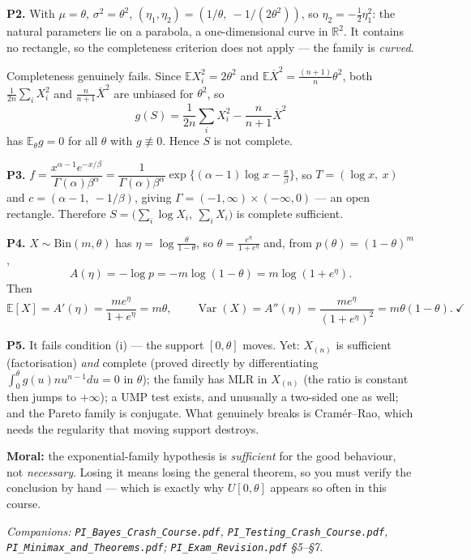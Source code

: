 \documentclass[11pt]{article}
\newcommand{\E}{\mathbb{E}}
\newcommand{\Var}{\operatorname{Var}}
\newcommand{\R}{\mathbb{R}}
\newcommand{\Xbar}{\overline{X}}
\begin{document}
\smallskip
\noindent\textbf{P2.} With $\mu=\theta$, $\sigma^{2}=\theta^{2}$,
$(\eta_1,\eta_2)=(1/\theta,\ -1/(2\theta^{2}))$, so $\eta_2=-\tfrac12\eta_1^{2}$: the natural
parameters lie on a parabola, a one-dimensional curve in $\R^{2}$. It contains no rectangle,
so the completeness criterion does not apply --- the family is \emph{curved}.

Completeness genuinely fails. Since $\E X_i^{2}=2\theta^{2}$ and
$\E\Xbar^{2}=\tfrac{(n+1)}{n}\theta^{2}$, both
$\tfrac{1}{2n}\sum_iX_i^{2}$ and $\tfrac{n}{n+1}\Xbar^{2}$ are unbiased for $\theta^{2}$, so
\[
g(S)=\frac{1}{2n}\sum_iX_i^{2}-\frac{n}{n+1}\Xbar^{2}
\]
has $\E_\theta g=0$ for all $\theta$ with $g\not\equiv0$. Hence $S$ is not complete.

\smallskip
\noindent\textbf{P3.}
$f=\dfrac{x^{\alpha-1}e^{-x/\beta}}{\Gamma(\alpha)\beta^{\alpha}}
=\dfrac{1}{\Gamma(\alpha)\beta^{\alpha}}\exp\{(\alpha-1)\log x-\tfrac{x}{\beta}\}$, so
$T=(\log x,\ x)$ and $c=(\alpha-1,\ -1/\beta)$, giving
$\Gamma=(-1,\infty)\times(-\infty,0)$ --- an open rectangle. Therefore
$S=\big(\sum_i\log X_i,\ \sum_iX_i\big)$ is complete sufficient.

\smallskip
\noindent\textbf{P4.} $X\sim\mathrm{Bin}(m,\theta)$ has $\eta=\log\frac{\theta}{1-\theta}$, so
$\theta=\frac{e^{\eta}}{1+e^{\eta}}$ and, from $p(\theta)=(1-\theta)^{m}$,
\[
A(\eta)=-\log p=-m\log(1-\theta)=m\log(1+e^{\eta}).
\]
Then
\[
\E[X]=A'(\eta)=\frac{me^{\eta}}{1+e^{\eta}}=m\theta,\qquad
\Var(X)=A''(\eta)=\frac{me^{\eta}}{(1+e^{\eta})^{2}}=m\theta(1-\theta). \ \checkmark
\]

\smallskip
\noindent\textbf{P5.} It fails condition (i) --- the support $[0,\theta]$ moves. Yet:
$X_{(n)}$ is sufficient (factorisation) \emph{and} complete (proved directly by
differentiating $\int_0^\theta g(u)nu^{n-1}du=0$ in $\theta$); the family has MLR in $X_{(n)}$
(the ratio is constant then jumps to $+\infty$); a UMP test exists, and unusually a two-sided
one as well; and the Pareto family is conjugate. What genuinely breaks is Cram\'er--Rao, which
needs the regularity that moving support destroys.

\textbf{Moral:} the exponential-family hypothesis is \emph{sufficient} for the good behaviour,
not \emph{necessary}. Losing it means losing the general theorem, so you must verify the
conclusion by hand --- which is exactly why $U[0,\theta]$ appears so often in this course.

\vfill
\begin{center}
\small\itshape
Companions: \texttt{PI\_Bayes\_Crash\_Course.pdf},
\texttt{PI\_Testing\_Crash\_Course.pdf},
\texttt{PI\_Minimax\_and\_Theorems.pdf};
\texttt{PI\_Exam\_Revision.pdf} \S5--\S7.
\end{center}
\end{document}
